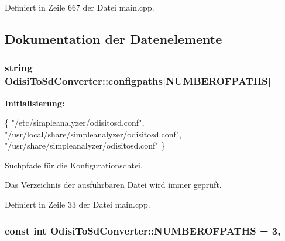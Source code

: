 Definiert in Zeile 667 der Datei main.\-cpp.



\subsection{Dokumentation der Datenelemente}
\hypertarget{classOdisiToSdConverter_aeecf67d22a4b6333ceabe5f1a1036736}{
\subsubsection[{configpaths}]{\setlength{\rightskip}{0pt plus 5cm}string Odisi\-To\-Sd\-Converter\-::configpaths\mbox{[}{\bf N\-U\-M\-B\-E\-R\-O\-F\-P\-A\-T\-H\-S}\mbox{]}\hspace{0.3cm}{\ttfamily [protected]}}}\label{classOdisiToSdConverter_aeecf67d22a4b6333ceabe5f1a1036736}
{\bfseries Initialisierung\-:}
\begin{DoxyCode}
\{
            \textcolor{stringliteral}{"/etc/simpleanalyzer/odisitosd.conf"},
            \textcolor{stringliteral}{"/usr/local/share/simpleanalyzer/odisitosd.conf"},
            \textcolor{stringliteral}{"/usr/share/simpleanalyzer/odisitosd.conf"} \}
\end{DoxyCode}


Suchpfade für die Konfigurationsdatei. 

Das Verzeichnis der ausführbaren Datei wird immer geprüft. 

Definiert in Zeile 33 der Datei main.\-cpp.

\hypertarget{classOdisiToSdConverter_a6f59f3670356c1588b736af33d59532a}{
\subsubsection[{N\-U\-M\-B\-E\-R\-O\-F\-P\-A\-T\-H\-S}]{\setlength{\rightskip}{0pt plus 5cm}const int Odisi\-To\-Sd\-Converter\-::\-N\-U\-M\-B\-E\-R\-O\-F\-P\-A\-T\-H\-S = 3\hspace{0.3cm}{\ttfamily [static]}, {\ttfamily [protected]}}}\label{classOdisiToSdConverter_a6f59f3670356c1588b736af33d59532a}



